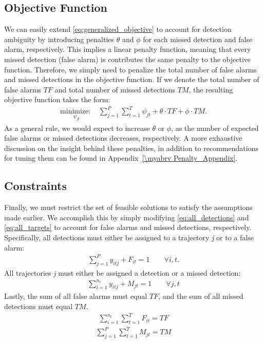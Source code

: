 \subsection{Objective Function}
We can easily extend \eqref{eq:generalized_objective} to account for detection ambiguity by introducing penalties $\theta$ and $\phi$ for each missed detection and false alarm, respectively. This implies a linear penalty function, meaning that every missed detection (false alarm) is contributes the same penalty to the objective function. Therefore, we simply need to penalize the total number of false alarms and missed detections in the objective function. If we denote the total number of false alarms $TF$ and total number of missed detections $TM$, the resulting objective function takes the form:
\begin{align*}
\underset{\psi_{jt}}{\text{minimize: }} & \sum_{j=1}^{P} \sum_{t=1}^{T} \psi_{jt} + \theta \cdot TF + \phi \cdot TM.
\end{align*}
As a general rule, we would expect to increase $\theta$ or $\phi$, as the number of expected false alarms or missed detections decreases, respectively. A more exhaustive discussion on the insight behind these penalties, in addition to recommendations for tuning them can be found in Appendix~\ref{\myabrv Penalty_Appendix}.

\subsection{Constraints}
Finally, we must restrict the set of feasible solutions to satisfy the assumptions made earlier. We accomplish this by simply modifying \eqref{eq:all_detections} and \eqref{eq:all_targets} to account for false alarms and missed detections, respectively. Specifically, all detections must either be assigned to a trajectory \textit{j} or to a false alarm:
\begin{align}\label{eqn: FA Simple}
\sum_{j=1}^{P} y_{itj} + F_{it} = 1 \qquad \forall i,t.
\end{align}
All trajectories \textit{j} must either be assigned a detection or a missed detection:
\begin{align}
\sum_{i=1}^{n_{t}} y_{itj} + M_{jt} = 1 \qquad \forall j,t
\end{align}
Lastly, the sum of all false alarms must equal $TF$, and the sum of all missed detections must equal $TM$. 
\begin{align*}
\sum_{i=1}^{n_{t}} \sum_{t=1}^{T} F_{it} = TF
\end{align*}
\begin{align}\label{eqn: MD Total}
\sum_{j=1}^{P} \sum_{t=1}^{T} M_{jt} = TM 
\end{align}

